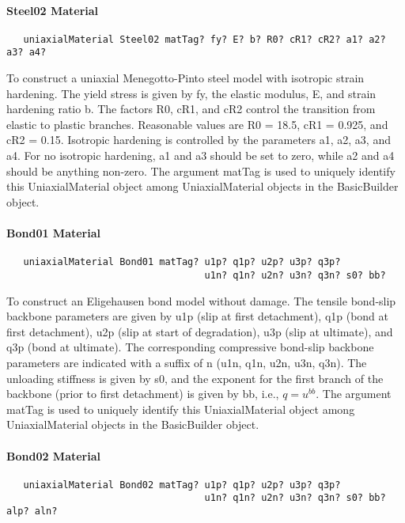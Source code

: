 \documentclass[12pt]{article}
\begin{document}
\paragraph{Steel02 Material}
{\sf\small
\begin{verbatim}
   uniaxialMaterial Steel02 matTag? fy? E? b? R0? cR1? cR2? a1? a2? a3? a4?
\end{verbatim}
}

To construct a uniaxial Menegotto-Pinto steel model with isotropic strain hardening.
The yield stress is given by fy, the elastic modulus, E, and strain hardening ratio b.
The factors R0, cR1, and cR2 control the transition from elastic to plastic branches.
Reasonable values are R0 = 18.5, cR1 = 0.925, and cR2 = 0.15. Isotropic hardening is
controlled by the parameters a1, a2, a3, and a4. For no isotropic hardening, a1 and
a3 should be set to zero, while a2 and a4 should be anything non-zero. The argument 
matTag is used to uniquely identify this UniaxialMaterial object among 
UniaxialMaterial objects in the BasicBuilder object.


\paragraph{Bond01 Material}
{\sf\small
\begin{verbatim}
   uniaxialMaterial Bond01 matTag? u1p? q1p? u2p? u3p? q3p?
                                   u1n? q1n? u2n? u3n? q3n? s0? bb?
\end{verbatim}  
}

To construct an Eligehausen bond model without damage. The tensile bond-slip backbone
parameters are given by u1p (slip at first detachment), q1p (bond at first
detachment), u2p (slip at start of degradation), u3p (slip at ultimate), and
q3p (bond at ultimate). The corresponding compressive bond-slip backbone parameters are
indicated with a suffix of n (u1n, q1n, u2n, u3n, q3n).  The unloading stiffness
is given by s0, and the exponent for the first branch of the backbone (prior
to first detachment) is given by bb, i.e., $q = u^{bb}$. The argument 
matTag is used to uniquely identify this UniaxialMaterial object among 
UniaxialMaterial objects in the BasicBuilder object.


\paragraph{Bond02 Material}
{\sf\small
\begin{verbatim}
   uniaxialMaterial Bond02 matTag? u1p? q1p? u2p? u3p? q3p?
                                   u1n? q1n? u2n? u3n? q3n? s0? bb? alp? aln?
\end{verbatim}
}
\end{document}

